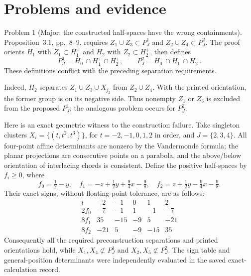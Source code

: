 \documentclass[10pt]{article}
\begin{document}
\section*{Problems and evidence}
Problem 1 (Major: the constructed half-spaces have the wrong containments).  Proposition 3.1, pp. 8–9, requires \(Z_1\cup Z_3\subset P_J^1\) and \(Z_2\cup Z_4\subset P_J^2\). The proof orients \(H_1\) with \(Z_1\subset H_1^+\) and \(H_2\) with \(Z_2\subset H_2^+\), then defines \[P_J^1=H_0^-\cap H_1^+\cap H_2^+,\qquad
 P_J^2=H_0^-\cap H_1^-\cap H_2^-.\] These definitions conflict with the preceding separation requirements.\par
Indeed, \(H_2\) separates \(Z_1\cup Z_3\cup X_{j_2}\) from \(Z_2\cup Z_4\). With the printed orientation, the former group is on its negative side. Thus nonempty \(Z_1\) or \(Z_3\) is excluded from the proposed \(P_J^1\); the analogous problem occurs for \(P_J^2\).\par
Here is an exact geometric witness to the construction failure. Take singleton clusters \(X_i=\{(t,t^2,t^3)\}\), for \(t=-2,-1,0,1,2\) in order, and \(J=\{2,3,4\}\). All four-point affine determinants are nonzero by the Vandermonde formula; the planar projections are consecutive points on a parabola, and the above/below orientation of interlacing chords is consistent. Define the positive half-spaces by \(f_i\ge0\), where \[f_0=\tfrac12-y,\quad
 f_1=-z+\tfrac12y+\tfrac94x-\tfrac98,\quad
 f_2=z+\tfrac12y-\tfrac94x-\tfrac98.\] Their exact signs, without floating-point tolerance, are as follows: \[\begin{array}{c|rrrrr}
 t&-2&-1&0&1&2\\ \hline
 2f_0&-7&-1&1&-1&-7\\
 8f_1&35&-15&-9&5&-21\\
 8f_2&-21&5&-9&-15&35
\end{array}\] Consequently all the required preconstruction separations and printed orientations hold, while \(X_1,X_4\not\subset P_J^1\) and \(X_2,X_5\not\subset P_J^2\). The sign table and general-position determinants were independently evaluated in the saved exact-calculation record.\par
\end{document}
